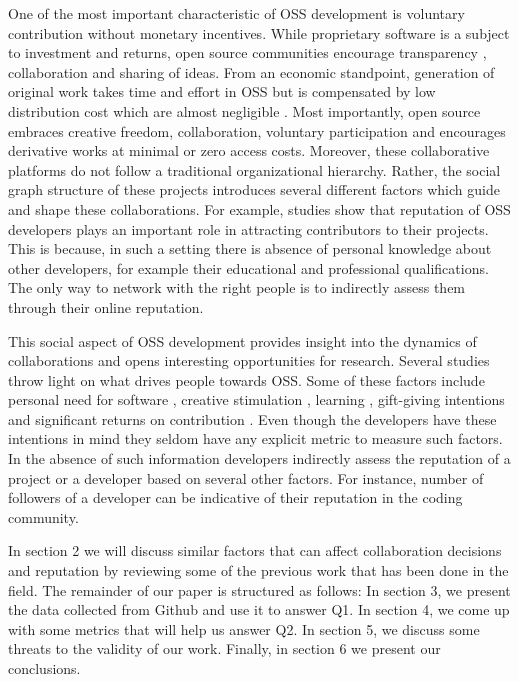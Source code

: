 One of the most important characteristic of OSS development is voluntary contribution \cite{Hippel2003} without monetary incentives. While proprietary software is a subject to investment and returns, open source communities encourage transparency \cite{Dabbish2012}, collaboration and sharing of ideas. From an economic standpoint, generation of original work takes time and effort in OSS but is compensated by low distribution cost which are almost negligible \cite{Lerner2002}. Most importantly, open source embraces creative freedom, collaboration, voluntary participation and encourages derivative works at minimal or zero access costs. Moreover, these collaborative platforms do not follow a traditional organizational hierarchy. Rather, the social graph structure of these projects introduces several different factors which guide and shape these collaborations. For example, studies \cite{Lerner2002} \cite{Raymond1998} show that reputation of OSS developers plays an important role in attracting contributors to their projects. This is because, in such a setting there is absence of personal knowledge about other developers, for example their educational and professional qualifications. The only way to network with the right people is to indirectly assess them through their online reputation.

This social aspect of OSS development provides insight into the dynamics of collaborations and opens interesting opportunities for research. Several studies throw light on what drives people towards OSS. Some of these factors include personal need for software \cite{Raymond1999}, creative stimulation \cite{lakhani2005}, learning \cite{Lakhani2003}, gift-giving intentions \cite{Zeitlyn2003} and significant returns on contribution \cite{ghosh2005}. Even though the developers have these intentions in mind they seldom have any explicit metric to measure such factors. In the absence of such information developers indirectly assess the reputation of a project or a developer based on several other factors. For instance, number of followers of a developer can be indicative of their reputation in the coding community.

In section 2 we will discuss similar factors that can affect collaboration decisions and reputation by reviewing some of the previous work that has been done in the field. The remainder of our paper is structured as follows: In section 3, we present the data collected from Github and use it to answer Q1. In section 4, we come up with some metrics that will help us answer Q2. In section 5, we discuss some threats to the validity of our work. Finally, in section 6 we present our conclusions.
